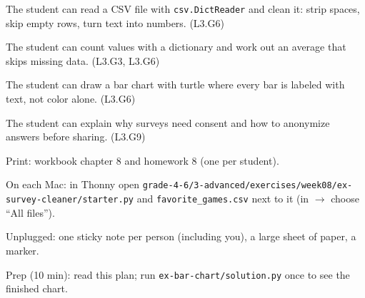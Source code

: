 
\begin{objectives}
  \item The student can read a CSV file with \texttt{csv.DictReader} and clean it: strip spaces, skip empty rows, turn text into numbers. (L3.G6)
  \item The student can count values with a dictionary and work out an average that skips missing data. (L3.G3, L3.G6)
  \item The student can draw a bar chart with turtle where every bar is labeled with text, not color alone. (L3.G6)
  \item The student can explain why surveys need consent and how to anonymize answers before sharing. (L3.G9)
\end{objectives}

\begin{materials}
  \item Print: workbook chapter 8 and homework 8 (one per student).
  \item On each Mac: in Thonny open \texttt{grade-4-6/3-advanced/exercises/week08/ex-survey-cleaner/starter.py} and \texttt{favorite\_games.csv} next to it (in  $\rightarrow$  choose \enquote{All files}).
  \item Unplugged: one sticky note per person (including you), a large sheet of paper, a marker.
  \item Prep (10 min): read this plan; run \texttt{ex-bar-chart/solution.py} once to see the finished chart.
\end{materials}

\begin{timeplan}
\end{timeplan}

